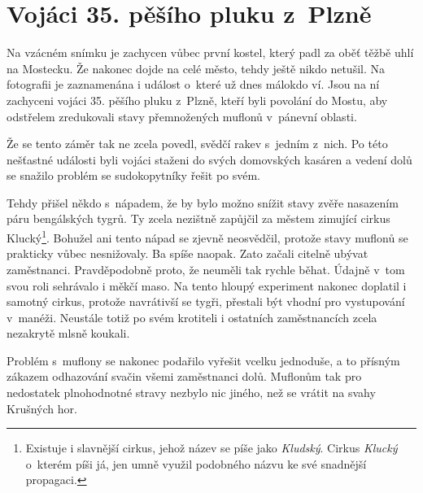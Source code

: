 
\chapter{Vojáci 35. pěšího pluku z~Plzně}

Na vzácném snímku je zachycen vůbec první kostel, který padl za oběť těžbě uhlí
na Mostecku. Že nakonec dojde na celé město, tehdy ještě nikdo netušil. Na
fotografii je zaznamenána i událost o~které už dnes málokdo ví. Jsou na ní
zachyceni vojáci 35. pěšího pluku z~Plzně, kteří byli povolání do Mostu, aby
odstřelem zredukovali stavy přemnožených muflonů v~pánevní oblasti.

Že se tento záměr tak ne zcela povedl, svědčí rakev s~jedním z~nich. Po této
nešťastné události byli vojáci staženi do svých domovských kasáren a vedení
dolů se snažilo problém se sudokopytníky řešit po svém.

Tehdy přišel někdo s~nápadem, že by bylo možno snížit stavy zvěře nasazením
páru bengálských tygrů. Ty zcela nezištně zapůjčil za městem zimující cirkus
Klucký\footnote{Existuje i slavnější cirkus, jehož název se píše jako {\em
Kludský}. Cirkus {\em Klucký} o~kterém píši já, jen umně využil podobného názvu
ke své snadnější propagaci.}. Bohužel ani tento nápad se zjevně neosvědčil,
protože stavy muflonů se prakticky vůbec nesnižovaly. Ba spíše naopak. Zato
začali citelně ubývat zaměstnanci. Pravděpodobně proto, že neuměli tak rychle
běhat. Údajně v~tom svou roli sehrávalo i měkčí maso. Na tento hloupý
experiment nakonec doplatil i samotný cirkus, protože navrátivší se tygři,
přestali být vhodní pro vystupování v~manéži. Neustále totiž po svém krotiteli
i ostatních zaměstnancích zcela nezakrytě mlsně koukali.

Problém s~muflony se nakonec podařilo vyřešit vcelku jednoduše, a to přísným
zákazem odhazování svačin všemi zaměstnanci dolů. Muflonům tak pro nedostatek
plnohodnotné stravy nezbylo nic jiného, než se vrátit na svahy Krušných hor.

